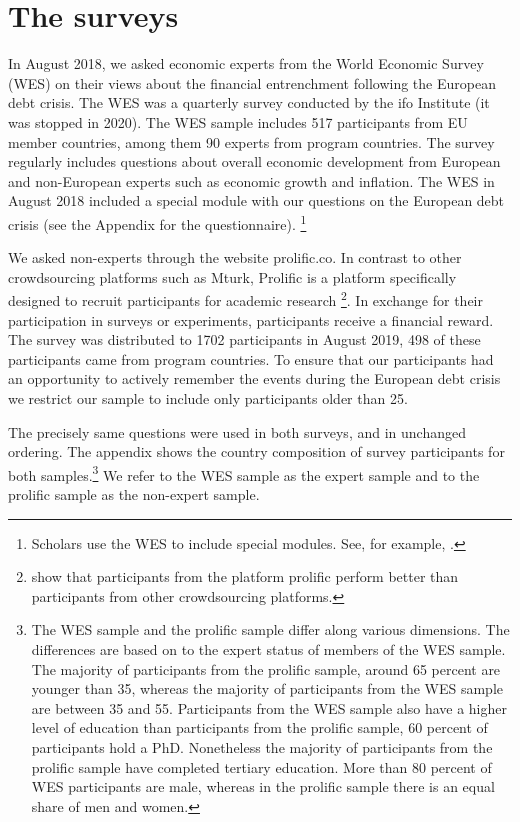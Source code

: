 \section{The surveys }
In August 2018, we asked economic experts from the World
Economic Survey (WES) on their views about the financial
entrenchment following the European debt crisis. The WES was a quarterly
survey conducted by the ifo Institute (it was stopped in 2020). The WES sample includes 517
participants from EU member countries, among them 90 experts from program countries.
The survey regularly includes questions about overall economic development
from European and non-European experts such as economic growth and
inflation. The WES in August 2018 included a special module with our
questions on the European debt crisis (see the Appendix for the
questionnaire). \footnote{Scholars use the WES to include special modules. See, for example, \cite{mosler}.}

We asked non-experts through the website
prolific.co. In contrast to other crowdsourcing platforms such as Mturk,
Prolific is a platform specifically designed to recruit participants for
academic research \footnote{\cite{Peer} show that participants from
the platform prolific perform better than participants from other
crowdsourcing platforms.}. In exchange for their participation in surveys or
experiments, participants receive a financial reward. The survey was
distributed to 1702 participants in August 2019, 498 of these participants
came from program countries. To ensure that our participants had an
opportunity to actively remember the events during the European debt crisis
we restrict our sample to include only participants older than 25.

The precisely same questions were used in both surveys, and in
unchanged ordering. The appendix shows the country composition of survey
participants for both samples.\footnote{%
The WES sample and the prolific sample differ along various
dimensions. The differences are based on to the expert status of members
of the WES sample. The majority of participants from the prolific sample,
around 65 percent are younger than 35, whereas the majority of participants
from the WES sample are between 35 and 55. Participants from the WES sample
also have a higher level of education than participants from the
prolific sample, 60 percent of participants hold a PhD. Nonetheless the
majority of participants from the prolific sample have completed tertiary
education. More than 80 percent of WES participants are male, whereas in the
prolific sample there is an equal share of men and women.} We refer to the
WES sample as the expert sample and to the prolific sample as the non-expert
sample. 